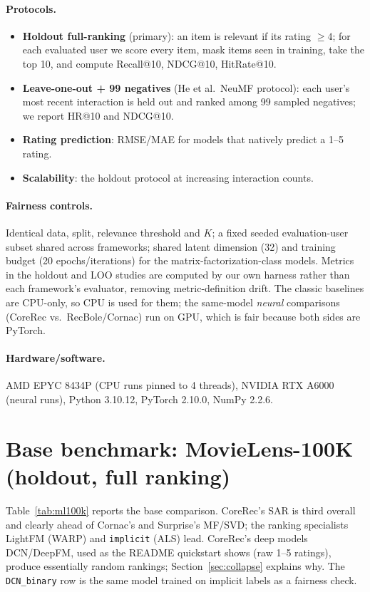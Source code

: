 \documentclass[10pt]{article}
\begin{document}
\paragraph{Protocols.}
\begin{itemize}
\item \textbf{Holdout full-ranking} (primary): an item is relevant if its rating
$\geq 4$; for each evaluated user we score every item, mask items seen in
training, take the top 10, and compute Recall@10, NDCG@10, HitRate@10.
\item \textbf{Leave-one-out + 99 negatives} (He et al.\ NeuMF protocol): each
user's most recent interaction is held out and ranked among 99 sampled
negatives; we report HR@10 and NDCG@10.
\item \textbf{Rating prediction}: RMSE/MAE for models that natively predict a
1--5 rating.
\item \textbf{Scalability}: the holdout protocol at increasing interaction counts.
\end{itemize}

\paragraph{Fairness controls.} Identical data, split, relevance threshold and
$K$; a fixed seeded evaluation-user subset shared across frameworks; shared
latent dimension (32) and training budget (20 epochs/iterations) for the
matrix-factorization-class models. Metrics in the holdout and LOO studies are
computed by our own harness rather than each framework's evaluator, removing
metric-definition drift. The classic baselines are CPU-only, so CPU is used for
them; the same-model \emph{neural} comparisons (CoreRec vs.\ RecBole/Cornac) run
on GPU, which is fair because both sides are PyTorch.

\paragraph{Hardware/software.} AMD EPYC 8434P (CPU runs pinned to 4 threads),
NVIDIA RTX A6000 (neural runs), Python 3.10.12, PyTorch 2.10.0, NumPy 2.2.6.

\section{Base benchmark: MovieLens-100K (holdout, full ranking)}
Table~\ref{tab:ml100k} reports the base comparison. CoreRec's SAR is third overall
and clearly ahead of Cornac's and Surprise's MF/SVD; the ranking specialists
LightFM (WARP) and \texttt{implicit} (ALS) lead. CoreRec's deep models DCN/DeepFM,
used as the README quickstart shows (raw 1--5 ratings), produce essentially random
rankings; Section~\ref{sec:collapse} explains why. The \texttt{DCN\_binary} row is
the same model trained on implicit labels as a fairness check.
\end{document}
